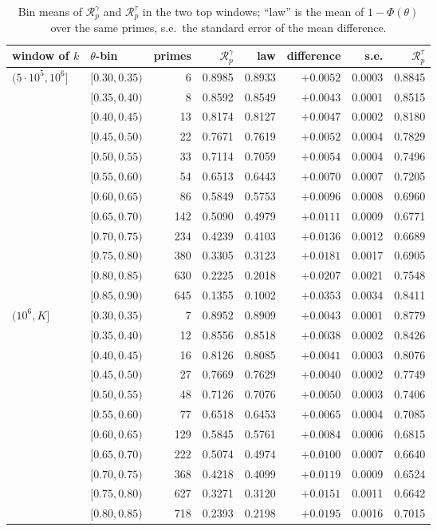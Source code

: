 \documentclass[preprint,12pt]{elsarticle}
\numberwithin{equation}{section}
\theoremstyle{plain}
\theoremstyle{definition}
\theoremstyle{remark}
\newcommand{\Rg}{\mathcal R^{\gamma}}
\newcommand{\Rt}{\mathcal R^{\tau}}
\begin{document}
\begin{table}[htbp]
\centering\small
\caption{Bin means of $\Rg_p$ and $\Rt_p$ in the two top windows; ``law'' is the mean of $1-\Phi(\theta)$ over the same primes, s.e.\ the standard error of the mean difference.}
\label{tab:response_bins}
\begin{tabular}{llrrrrrr}
\toprule
window of $k$ & $\theta$-bin & primes & $\Rg_p$ & law & difference & s.e. & $\Rt_p$\\
\midrule
$(5\cdot10^5,10^6]$ & $[0.30,0.35)$ & 6 & 0.8985 & 0.8933 & $+0.0052$ & 0.0003 & 0.8845\\
 & $[0.35,0.40)$ & 8 & 0.8592 & 0.8549 & $+0.0043$ & 0.0001 & 0.8515\\
 & $[0.40,0.45)$ & 13 & 0.8174 & 0.8127 & $+0.0047$ & 0.0002 & 0.8180\\
 & $[0.45,0.50)$ & 22 & 0.7671 & 0.7619 & $+0.0052$ & 0.0004 & 0.7829\\
 & $[0.50,0.55)$ & 33 & 0.7114 & 0.7059 & $+0.0054$ & 0.0004 & 0.7496\\
 & $[0.55,0.60)$ & 54 & 0.6513 & 0.6443 & $+0.0070$ & 0.0007 & 0.7205\\
 & $[0.60,0.65)$ & 86 & 0.5849 & 0.5753 & $+0.0096$ & 0.0008 & 0.6960\\
 & $[0.65,0.70)$ & 142 & 0.5090 & 0.4979 & $+0.0111$ & 0.0009 & 0.6771\\
 & $[0.70,0.75)$ & 234 & 0.4239 & 0.4103 & $+0.0136$ & 0.0012 & 0.6689\\
 & $[0.75,0.80)$ & 380 & 0.3305 & 0.3123 & $+0.0181$ & 0.0017 & 0.6905\\
 & $[0.80,0.85)$ & 630 & 0.2225 & 0.2018 & $+0.0207$ & 0.0021 & 0.7548\\
 & $[0.85,0.90)$ & 645 & 0.1355 & 0.1002 & $+0.0353$ & 0.0034 & 0.8411\\
\addlinespace
$(10^6,K]$ & $[0.30,0.35)$ & 7 & 0.8952 & 0.8909 & $+0.0043$ & 0.0001 & 0.8779\\
 & $[0.35,0.40)$ & 12 & 0.8556 & 0.8518 & $+0.0038$ & 0.0002 & 0.8426\\
 & $[0.40,0.45)$ & 16 & 0.8126 & 0.8085 & $+0.0041$ & 0.0003 & 0.8076\\
 & $[0.45,0.50)$ & 27 & 0.7669 & 0.7629 & $+0.0040$ & 0.0002 & 0.7749\\
 & $[0.50,0.55)$ & 48 & 0.7126 & 0.7076 & $+0.0050$ & 0.0003 & 0.7406\\
 & $[0.55,0.60)$ & 77 & 0.6518 & 0.6453 & $+0.0065$ & 0.0004 & 0.7085\\
 & $[0.60,0.65)$ & 129 & 0.5845 & 0.5761 & $+0.0084$ & 0.0006 & 0.6815\\
 & $[0.65,0.70)$ & 222 & 0.5074 & 0.4974 & $+0.0100$ & 0.0007 & 0.6640\\
 & $[0.70,0.75)$ & 368 & 0.4218 & 0.4099 & $+0.0119$ & 0.0009 & 0.6524\\
 & $[0.75,0.80)$ & 627 & 0.3271 & 0.3120 & $+0.0151$ & 0.0011 & 0.6642\\
 & $[0.80,0.85)$ & 718 & 0.2393 & 0.2198 & $+0.0195$ & 0.0016 & 0.7015\\
\bottomrule
\end{tabular}
\end{table}
\end{document}
